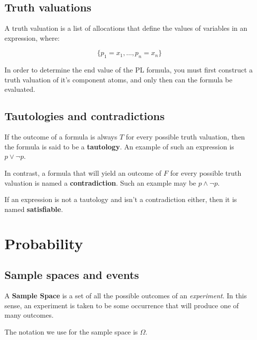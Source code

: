 \subsection{Truth valuations}

A truth valuation is a list of allocations that define the values of variables
in an expression, where:

\begin{dmath}
	\{p_1=x_1,\dots, p_n=x_n\}
\end{dmath}


In order to determine the end value of the PL formula, you must first construct
a truth valuation of it's component atoms, and only then can the formula be
evaluated.

\subsection{Tautologies and contradictions}

If the outcome of a formula is always $T$ for every possible truth valuation,
then the formula is said to be a {\bf tautology}. An example of such an
expression is $p \vee \neg p$.

In contrast, a formula that will yield an outcome of $F$ for every possible
truth valuation is named a {\bf contradiction}. Such an example may be $p \wedge
\neg p$.

If an expression is not a tautology and isn't a contradiction either, then it is
named {\bf satisfiable}.


\section{Probability}

\subsection{Sample spaces and events}

A {\bf Sample Space} is a set of all the possible outcomes of an {\it
experiment}. In this sense, an experiment is taken to be some occurrence that
will produce one of many outcomes.

The notation we use for the sample space is $\Omega$.

